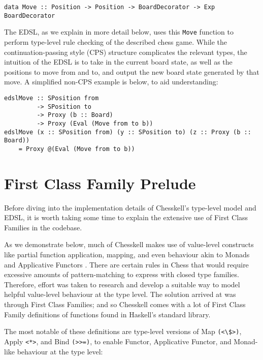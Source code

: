 \documentclass[12pt, a4paper, bibliography=totocnumbered]{scrreprt}
\newcommand{\inline}[1]{\lstinline[basicstyle=\ttfamily\footnotesize]{#1}}
\begin{document}
\begin{lstlisting}
data Move :: Position -> Position -> BoardDecorator -> Exp BoardDecorator
\end{lstlisting}

The EDSL, as we explain in more detail below, uses this \inline{Move} function to perform type-level rule checking of the described chess game. While the continuation-passing style (CPS) structure complicates the relevant types, the intuition of the EDSL is to take in the current board state, as well as the positions to move from and to, and output the new board state generated by that move. A simplified non-CPS example is below, to aid understanding:

\begin{lstlisting}
edslMove :: SPosition from
         -> SPosition to
         -> Proxy (b :: Board)
         -> Proxy (Eval (Move from to b))
edslMove (x :: SPosition from) (y :: SPosition to) (z :: Proxy (b :: Board))
    = Proxy @(Eval (Move from to b))
\end{lstlisting}

\section{First Class Family Prelude}

Before diving into the implementation details of Chesskell's type-level model and EDSL, it is worth taking some time to explain the extensive use of First Class Families in the codebase.

As we demonstrate below, much of Chesskell makes use of value-level constructs like partial function application, mapping, and even behaviour akin to Monads and Applicative Functors \cite{applicatives}. There are certain rules in Chess that would require excessive amounts of pattern-matching to express with closed type families. Therefore, effort was taken to research and develop a suitable way to model helpful value-level behaviour at the type level. The solution arrived at was through First Class Families; and so Chesskell comes with a lot of First Class Family definitions of functions found in Haskell's standard library.

The most notable of these definitions are type-level versions of Map \inline{(<\$>)}, Apply \inline{<*>}, and Bind \inline{(>>=)}, to enable Functor, Applicative Functor, and Monad-like behaviour at the type level:
\end{document}
